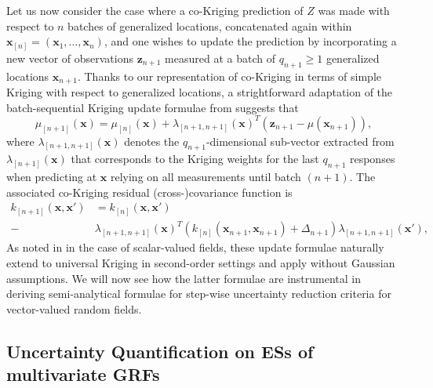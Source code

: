 \documentclass[aoas]{imsart}
\begin{document}
Let us now consider the case where a co-Kriging prediction of $Z$ was
made with respect to $n$ batches of generalized locations, concatenated again within $\bm{x}_{[n]}=(\bm{x}_1,\dots, \bm{x}_n)$,
and one wishes to update the prediction by incorporating a new vector
of observations $\mathbf{z}_{n+1}$ measured at a batch of
$q_{n+1} \geq 1$ generalized locations $\bm{x}_{n+1}$.
Thanks to our representation of co-Kriging in terms of simple Kriging
with respect to generalized locations, a strightforward adaptation of
the batch-sequential Kriging update formulae from
\citep{Chevalier.etal2013a} suggests that
% 
\begin{equation}\label{eq:meanCoK}
\mu_{[n+1]}(\bm{x})=\mu_{[n]}(\bm{x})+\lambda_{[n+1,n+1]}(\bm{x})^T (\mathbf{z}_{n+1}-\mu(\bm{x}_{n+1})),
\end{equation}
where $\lambda_{[n+1,n+1]}(\bm{x})$ denotes the $q_{n+1}$-dimensional
sub-vector extracted from $\lambda_{[n+1]}(\bm{x})$ that corresponds
to the Kriging weights for the last $q_{n+1}$ responses
when predicting at $\bm{x}$ relying on all measurements until batch
$(n+1)$.
The associated co-Kriging residual (cross-)covariance function is
\begin{align}\label{eq:varCoK}
k_{[n+1]}(\bm{x},\bm{x}') & = k_{[n]}(\bm{x},\bm{x}')\\
 \nonumber - & \lambda_{[n+1,n+1]}(\bm{x})^T 
\left(k_{[n]}(\bm{x}_{n+1}, \bm{x}_{n+1})+\Delta_{n+1}\right)
\lambda_{{[n+1,n+1]}}(\bm{x}'),
\end{align}
%
As noted in \citep{Chevalier2015} in the case of scalar-valued fields,
these update formulae naturally extend to universal Kriging in
second-order settings and apply without Gaussian assumptions. We will
now see how the latter formulae are instrumental in deriving
semi-analytical formulae for step-wise uncertainty reduction criteria
for vector-valued random fields.

\subsection{Uncertainty Quantification on ESs of multivariate GRFs}
\label{sec:set_uq}
\end{document}
